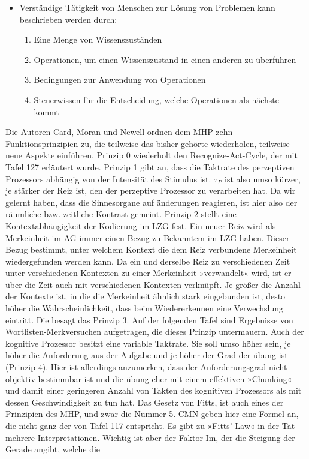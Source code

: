 \documentclass[paper=a4, fontsize=11pt]{scrartcl} %
\numberwithin{equation}{section} %
\numberwithin{figure}{section} %
\numberwithin{table}{section} %
\begin{document}
\begin{itemize}
\begin{itemize}
\item Verständige Tätigkeit von Menschen zur Lösung von Problemen kann beschrieben werden durch:
\begin{enumerate}
\item Eine Menge von Wissenszuständen
\item Operationen, um einen Wissenszustand in einen anderen zu überführen
\item Bedingungen zur Anwendung von Operationen
\item Steuerwissen für die Entscheidung, welche Operationen als nächste kommt
\end{enumerate}
\end{itemize}
\end{itemize}

Die Autoren Card, Moran und Newell ordnen dem MHP zehn Funktionsprinzipien zu, die teilweise das bisher gehörte wiederholen, teilweise neue Aspekte einführen.
Prinzip 0 wiederholt den Recognize-Act-Cycle, der mit Tafel 127 erläutert wurde.
Prinzip 1 gibt an, dass die Taktrate des perzeptiven Prozessors abhängig von der Intensität des Stimulus ist. $\tau_P$ ist also umso kürzer, je stärker der Reiz ist,
den der perzeptive Prozessor zu verarbeiten hat. Da wir gelernt haben, dass die Sinnesorgane auf änderungen reagieren, ist hier also der räumliche bzw. zeitliche Kontrast gemeint.
Prinzip 2 stellt eine Kontextabhängigkeit der Kodierung im LZG fest. Ein neuer Reiz wird als Merkeinheit im AG immer einen Bezug zu Bekanntem im LZG haben. Dieser Bezug bestimmt, unter welchem Kontext die dem Reiz verbundene Merkeinheit wiedergefunden werden kann.
Da ein und derselbe Reiz zu verschiedenen Zeit unter verschiedenen Kontexten zu einer Merkeinheit »verwandelt« wird, ist er über die Zeit auch mit verschiedenen Kontexten verknüpft. Je größer die Anzahl der Kontexte ist, in die die Merkeinheit ähnlich stark eingebunden ist, desto höher die Wahrscheinlichkeit, dass beim Wiedererkennen eine Verwechslung eintritt. Die besagt das Prinzip 3.
Auf der folgenden Tafel sind Ergebnisse von Wortlisten-Merkversuchen aufgetragen, die dieses Prinzip untermauern.
Auch der kognitive Prozessor besitzt eine variable Taktrate. Sie soll umso höher sein, je höher die Anforderung aus der Aufgabe und je höher der Grad der übung ist (Prinzip 4). Hier ist allerdings anzumerken, dass der Anforderungsgrad nicht objektiv bestimmbar ist und die übung eher mit einem effektiven »Chunking« und damit einer geringeren Anzahl von Takten des kognitiven Prozessors als mit dessen Geschwindigkeit zu tun hat.
Das Gesetz von Fitts, ist auch eines der Prinzipien des MHP, und zwar die Nummer 5. CMN geben hier eine Formel an, die nicht ganz der von Tafel 117 entspricht. Es gibt zu »Fitts' Law« in der Tat mehrere Interpretationen. Wichtig ist aber der Faktor Im, der die Steigung der Gerade angibt, welche die
\end{document}
